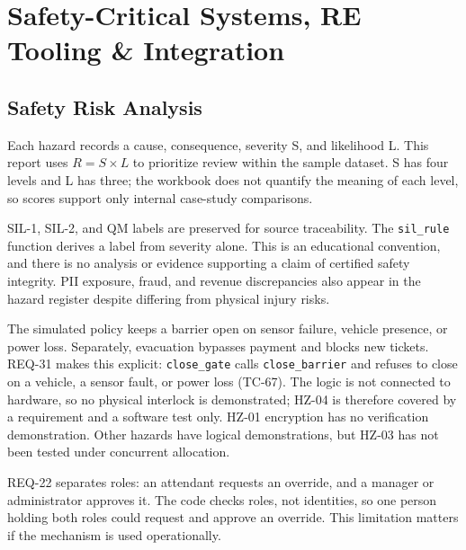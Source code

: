 \chapter{Safety-Critical Systems, RE Tooling \& Integration}
\section{Safety Risk Analysis}
Each hazard records a cause, consequence, severity S, and likelihood L. This report uses $R=S\times L$ to prioritize review within the sample dataset. S has four levels and L has three; the workbook does not quantify the meaning of each level, so scores support only internal case-study comparisons.


SIL-1, SIL-2, and QM labels are preserved for source traceability. The \texttt{sil\_rule} function derives a label from severity alone. This is an educational convention, and there is no analysis or evidence supporting a claim of certified safety integrity. PII exposure, fraud, and revenue discrepancies also appear in the hazard register despite differing from physical injury risks.

The simulated policy keeps a barrier open on sensor failure, vehicle presence, or power loss. Separately, evacuation bypasses payment and blocks new tickets. REQ-31 makes this explicit: \texttt{close\_gate} calls \texttt{close\_barrier} and refuses to close on a vehicle, a sensor fault, or power loss (TC-67). The logic is not connected to hardware, so no physical interlock is demonstrated; HZ-04 is therefore covered by a requirement and a software test only. HZ-01 encryption has no verification demonstration. Other hazards have logical demonstrations, but HZ-03 has not been tested under concurrent allocation.

REQ-22 separates roles: an attendant requests an override, and a manager or administrator approves it. The code checks roles, not identities, so one person holding both roles could request and approve an override. This limitation matters if the mechanism is used operationally.

